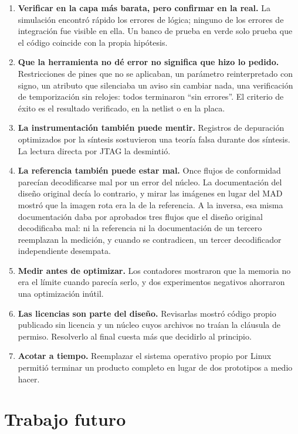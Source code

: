 \begin{enumerate}
  \item \textbf{Verificar en la capa más barata, pero confirmar en la real.}
    La simulación encontró rápido los errores de lógica; ninguno de los
    errores de integración fue visible en ella. Un banco de prueba en verde
    solo prueba que el código coincide con la propia hipótesis.
  \item \textbf{Que la herramienta no dé error no significa que hizo lo
    pedido.} Restricciones de pines que no se aplicaban, un parámetro
    reinterpretado con signo, un atributo que silenciaba un aviso sin cambiar
    nada, una verificación de temporización sin relojes: todos terminaron
    \enquote{sin errores}. El criterio de éxito es el resultado verificado,
    en la netlist o en la placa.
  \item \textbf{La instrumentación también puede mentir.} Registros de
    depuración optimizados por la síntesis sostuvieron una teoría falsa
    durante dos síntesis. La lectura directa por JTAG la desmintió.
  \item \textbf{La referencia también puede estar mal.} Once flujos de
    conformidad parecían decodificarse mal por un error del núcleo. La
    documentación del diseño original decía lo contrario, y mirar las
    imágenes en lugar del MAD mostró que la imagen rota era la de la
    referencia. A la inversa, esa misma documentación daba por aprobados
    tres flujos que el diseño original decodificaba mal: ni la referencia
    ni la documentación de un tercero reemplazan la medición, y cuando se
    contradicen, un tercer decodificador independiente desempata.
  \item \textbf{Medir antes de optimizar.} Los contadores mostraron que la
    memoria no era el límite cuando parecía serlo, y dos experimentos
    negativos ahorraron una optimización inútil.
  \item \textbf{Las licencias son parte del diseño.} Revisarlas mostró
    código propio publicado sin licencia y un núcleo cuyos archivos no
    traían la cláusula de permiso. Resolverlo al final cuesta más que
    decidirlo al principio.
  \item \textbf{Acotar a tiempo.} Reemplazar el sistema operativo propio por
    Linux permitió terminar un producto completo en lugar de dos prototipos
    a medio hacer.
\end{enumerate}

\section{Trabajo futuro}

